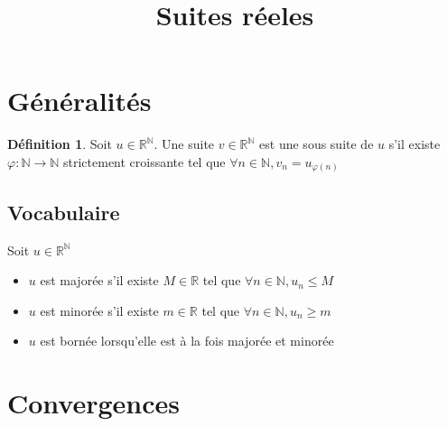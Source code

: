 \documentclass[fleqn]{article}
\title{Suites r\'eeles}
\date{}
\theoremstyle{definition} \newtheorem*{defi}{D\'efinition}
\theoremstyle{definition} \newtheorem*{theo}{Th\'eor\`eme}
\begin{document}
\maketitle

\section{G\'en\'eralit\'es}
\begin{defi}
		Soit $u \in \mathbb{R}^\mathbb{N}$. Une suite $v \in \mathbb{R}^\mathbb{N}$ est une sous suite de $u$ s'il existe
		$\varphi: \mathbb{N} \rightarrow \mathbb{N}$ strictement croissante tel que $\forall n \in \mathbb{N}, v_n = u_{\varphi(n)}$
\end{defi}

\subsection{Vocabulaire}
Soit $u \in \mathbb{R}^\mathbb{N}$
\begin{itemize}
	\item $u$ est major\'ee s'il existe $M \in \mathbb{R}$ tel que $\forall n \in \mathbb{N}, u_n \leq M$
	\item $u$ est minor\'ee s'il existe $m \in \mathbb{R}$ tel que $\forall n \in \mathbb{N}, u_n \geq m$
	\item $u$ est born\'ee lorsqu'elle est \`a la fois major\'ee et minor\'ee
\end{itemize}

\section{Convergences}
\end{document}
